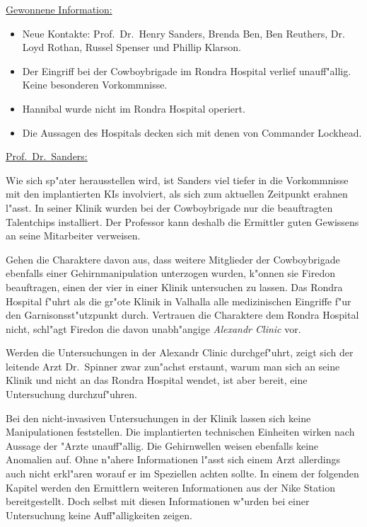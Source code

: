 \begin{remarks}
	\underline{Gewonnene Information:}
	
	\begin{itemize}
		\item Neue Kontakte: Prof.~Dr.~Henry Sanders, Brenda Ben, Ben Reuthers, Dr. Loyd Rothan, Russel Spenser und Phillip Klarson. 
		\item Der Eingriff bei der Cowboybrigade im Rondra Hospital verlief unauff"allig. Keine besonderen Vorkommnisse.
		\item Hannibal wurde nicht im Rondra Hospital operiert.
		\item Die Aussagen des Hospitals decken sich mit denen von Commander Lockhead. 
	\end{itemize}

	\underline{Prof.~Dr.~Sanders:}

	Wie sich sp"ater herausstellen wird, ist Sanders viel tiefer in die Vorkommnisse mit den implantierten KIs involviert, als sich zum aktuellen Zeitpunkt erahnen l"asst. In seiner Klinik wurden bei der Cowboybrigade nur die beauftragten Talentchips installiert. Der Professor kann deshalb die Ermittler guten Gewissens an seine Mitarbeiter verweisen.
\end{remarks}


Gehen die Charaktere davon aus, dass weitere Mitglieder der Cowboybrigade ebenfalls einer Gehirnmanipulation unterzogen wurden, k"onnen sie Firedon beauftragen, einen der vier in einer Klinik untersuchen zu lassen. Das Rondra Hospital f"uhrt als die gr"o\3te Klinik in Valhalla alle medizinischen Eingriffe f"ur den Garnisonsst"utzpunkt durch. Vertrauen die Charaktere dem Rondra Hospital nicht, schl"agt Firedon die davon unabh"angige \emph{Alexandr Clinic} vor.

Werden die Untersuchungen in der Alexandr Clinic durchgef"uhrt, zeigt sich der leitende Arzt Dr.~Spinner zwar zun"achst erstaunt, warum man sich an seine Klinik und nicht an das Rondra Hospital wendet, ist aber bereit, eine Untersuchung durchzuf"uhren.

Bei den nicht-invasiven Untersuchungen in der Klinik lassen sich keine Manipulationen feststellen. Die implantierten technischen Einheiten wirken nach Aussage der "Arzte unauff"allig. Die Gehirnwellen weisen ebenfalls keine Anomalien auf. Ohne n"ahere Informationen l"asst sich einem Arzt allerdings auch nicht erkl"aren worauf er im Speziellen achten sollte. In einem der folgenden Kapitel werden den Ermittlern weiteren Informationen aus der Nike Station bereitgestellt. Doch selbst mit diesen Informationen w"urden bei einer Untersuchung keine Auff"alligkeiten zeigen.

